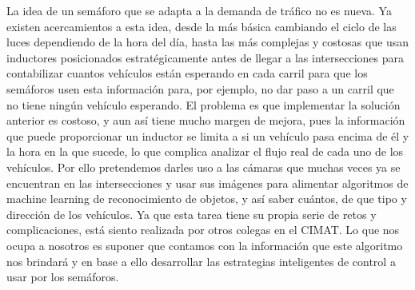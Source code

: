 La idea de un semáforo que se adapta a la demanda de tráfico no es
nueva. Ya existen acercamientos a esta idea, desde la más básica
cambiando el ciclo de las luces dependiendo de la hora del día, hasta
las más complejas y costosas que usan inductores posicionados
estratégicamente antes de llegar a las intersecciones para contabilizar
cuantos vehículos están esperando en cada carril para que los semáforos
usen esta información para, por ejemplo, no dar paso a un carril que no
tiene ningún vehículo esperando. El problema es que implementar la
solución anterior es costoso, y aun así tiene mucho margen de mejora,
pues la información que puede proporcionar un inductor se limita a si un
vehículo pasa encima de él y la hora en la que sucede, lo que complica
analizar el flujo real de cada uno de los vehículos. Por ello
pretendemos darles uso a las cámaras que muchas veces ya se encuentran
en las intersecciones y usar sus imágenes para alimentar algoritmos de
machine learning de reconocimiento de objetos, y así saber cuántos, de
que tipo y dirección de los vehículos. Ya que esta tarea tiene su propia
serie de retos y complicaciones, está siento realizada por otros colegas
en el CIMAT. Lo que nos ocupa a nosotros es suponer que contamos con la
información que este algoritmo nos brindará y en base a ello desarrollar
las estrategias inteligentes de control a usar por los semáforos.

\clearpage %
